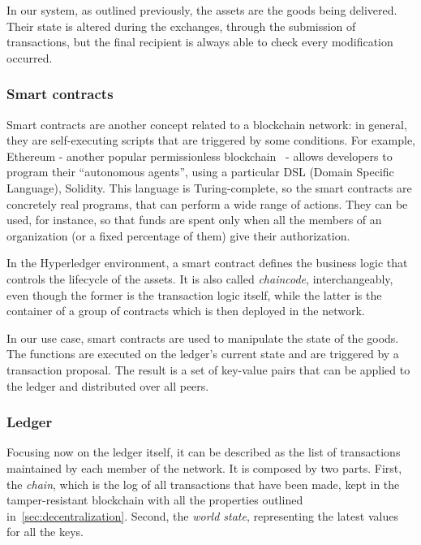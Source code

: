 In our system, as outlined previously, the assets are the goods being delivered. Their state is altered during the exchanges, through the submission of transactions, but the final recipient is always able to check every modification occurred.

\subsubsection{Smart contracts}
Smart contracts are another concept related to a blockchain network: in general, they are self-executing scripts that are triggered by some conditions. For example, Ethereum - another popular permissionless blockchain~\cite{ethereum} - allows developers to program their ``autonomous agents'', using a particular DSL (Domain Specific Language), Solidity. This language is Turing-complete, so the smart contracts are concretely real programs, that can perform a wide range of actions. They can be used, for instance, so that funds are spent only when all the members of an organization (or a fixed percentage of them) give their authorization. 

In the Hyperledger environment, a smart contract defines the business logic that controls the lifecycle of the assets. It is also called \emph{chaincode}, interchangeably, even though the former is the transaction logic itself, while the latter is the container of a group of contracts which is then deployed in the network. 

In our use case, smart contracts are used to manipulate the state of the goods. The functions are executed on the ledger’s current state and are triggered by a transaction proposal. The result is a set of key-value pairs that can be applied to the ledger and distributed over all peers.

\subsubsection{Ledger}
Focusing now on the ledger itself, it can be described as the list of transactions maintained by each member of the network. It is composed by two parts. First, the \emph{chain}, which is the log of all transactions that have been made, kept in the tamper-resistant blockchain with all the properties outlined in~\ref{sec:decentralization}. Second, the \emph{world state}, representing the latest values for all the keys. 

